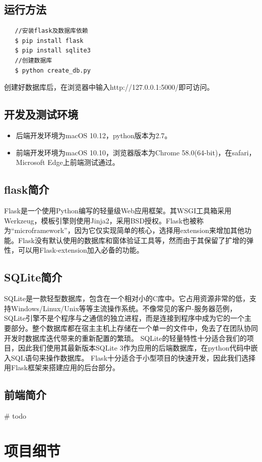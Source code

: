 \documentclass[12pt, oneside,a4paper]{article}
\begin{document}
\subsection{运行方法}
\begin{lstlisting}
   //安装flask及数据库依赖
   $ pip install flask   
   $ pip install sqlite3
   //创建数据库
   $ python create_db.py
   \end{lstlisting}
创建好数据库后，在浏览器中输入http://127.0.0.1:5000/即可访问。
\subsection{开发及测试环境}
\begin{itemize}
\item 后端开发环境为macOS 10.12，python版本为2.7。
\item 前端开发环境为macOS 10.10，浏览器版本为Chrome 58.0(64-bit)，在safari，Microsoft Edge上前端测试通过。
\end{itemize}
\subsection{flask简介}
Flask是一个使用Python编写的轻量级Web应用框架。其WSGI工具箱采用Werkzeug，模板引擎则使用Jinja2，采用BSD授权。Flask也被称为“microframework”，因为它仅实现简单的核心，选择用extension来增加其他功能。Flask没有默认使用的数据库和窗体验证工具等，然而由于其保留了扩增的弹性，可以用Flask-extension加入必备的功能。
\subsection{SQLite简介}
SQLite是一款轻型数据库，包含在一个相对小的C库中。它占用资源非常的低，支持Windows/Linux/Unix等等主流操作系统。不像常见的客户-服务器范例，SQLite引擎不是个程序与之通信的独立进程，而是连接到程序中成为它的一个主要部分。整个数据库都在宿主主机上存储在一个单一的文件中，免去了在团队协同开发时数据库迭代带来的重新配置的繁琐。
SQLite的轻量特性十分适合我们的项目，因此我们使用其最新版本SQLite 3作为应用的后端数据库，在python代码中嵌入SQL语句来操作数据库。
Flask十分适合于小型项目的快速开发，因此我们选择用Flask框架来搭建应用的后台部分。
\subsection{前端简介}
\# todo


\section{项目细节}
\end{document}

